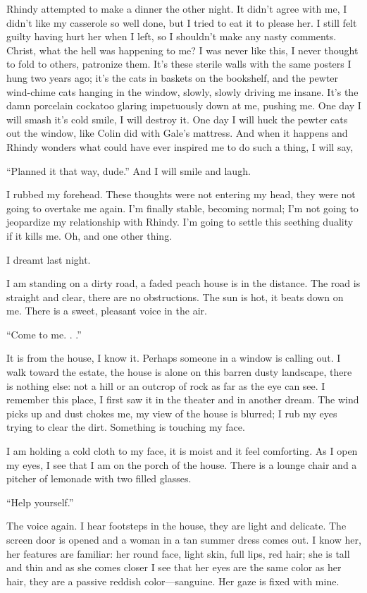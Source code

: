 Rhindy attempted to make a dinner the other night. It didn't agree with
me, I didn't like my casserole so well done, but I tried to eat it to
please her. I still felt guilty having hurt her when I left, so I
shouldn't make any nasty comments. Christ, what the hell was happening
to me? I was never like this, I never thought to fold to others,
patronize them. It's these sterile walls with the same posters I hung
two years ago; it's the cats in baskets on the bookshelf, and the pewter
wind-chime cats hanging in the window, slowly, slowly driving me insane.
It's the damn porcelain cockatoo glaring impetuously down at me, pushing
me. One day I will smash it's cold smile, I will destroy it. One day I
will huck the pewter cats out the window, like Colin did with Gale's
mattress. And when it happens and Rhindy wonders what could have ever
inspired me to do such a thing, I will say,

``Planned it that way, dude.'' And I will smile and laugh.

I rubbed my forehead. These thoughts were not entering my head, they
were not going to overtake me again. I'm finally stable, becoming
normal; I'm not going to jeopardize my relationship with Rhindy. I'm
going to settle this seething duality if it kills me. Oh, and one other
thing.

I dreamt last night.

I am standing on a dirty road, a faded peach house is in the distance.
The road is straight and clear, there are no obstructions. The sun is
hot, it beats down on me. There is a sweet, pleasant voice in the air.

``Come to me. . .''

It is from the house, I know it. Perhaps someone in a window is calling
out. I walk toward the estate, the house is alone on this barren dusty
landscape, there is nothing else: not a hill or an outcrop of rock as
far as the eye can see. I remember this place, I first saw it in the
theater and in another dream. The wind picks up and dust chokes me, my
view of the house is blurred; I rub my eyes trying to clear the dirt.
Something is touching my face.

I am holding a cold cloth to my face, it is moist and it feel
comforting. As I open my eyes, I see that I am on the porch of the
house. There is a lounge chair and a pitcher of lemonade with two filled
glasses.

``Help yourself.''

The voice again. I hear footsteps in the house, they are light and
delicate. The screen door is opened and a woman in a tan summer dress
comes out. I know her, her features are familiar: her round face, light
skin, full lips, red hair; she is tall and thin and as she comes closer
I see that her eyes are the same color as her hair, they are a passive
reddish color---sanguine. Her gaze is fixed with mine.

